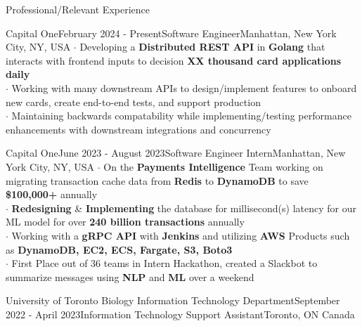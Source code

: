 \documentclass[UTF8]{resume} %
\begin{document}
\begin{rSection}{Professional/Relevant Experience}
\begin{rSubsection}{Capital One}{February 2024 - Present}{Software Engineer}{Manhattan, New York City, NY, USA}
   $\cdot$ Developing a \textbf{Distributed REST API} in \textbf{Golang} that interacts with frontend inputs to decision \textbf{XX thousand card applications daily} \\
   $\cdot$ Working with many downstream APIs to design/implement features to onboard new cards, create end-to-end tests, and support production \\ 
   $\cdot$ Maintaining backwards compatability while implementing/testing performance enhancements with downstream integrations and concurrency
\end{rSubsection}
\begin{rSubsection}{Capital One}{June 2023 - August 2023}{Software Engineer Intern}{Manhattan, New York City, NY, USA}
    $\cdot$ On the \textbf{Payments Intelligence} Team working on migrating transaction cache data from \textbf{Redis} to \textbf{DynamoDB} to save \textbf{\$100,000+} annually\\
    $\cdot$ \textbf{Redesigning} \& \textbf{Implementing} the database for millisecond(s) latency for our ML model for over \textbf{240 billion transactions} annually \\
    $\cdot$ Working with a \textbf{gRPC API} with \textbf{Jenkins} and utilizing \textbf{AWS} Products such as \textbf{DynamoDB, EC2, ECS, Fargate, S3, Boto3} \\
    $\cdot$ First Place out of 36 teams in Intern Hackathon, created a Slackbot to summarize messages using \textbf{NLP} and \textbf{ML} over a weekend
\end{rSubsection}
\begin{rSubsection}{University of Toronto Biology Information Technology Department}{September 2022 - April 2023}{Information Technology Support Assistant}{Toronto, ON Canada}

\end{rSubsection}
\end{rSection}
\end{document}
